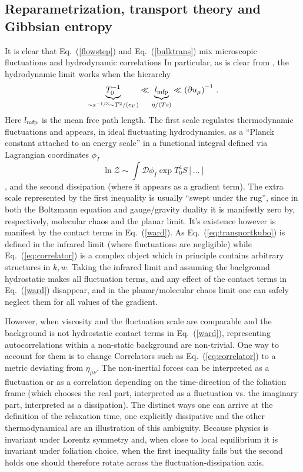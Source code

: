 \documentclass[12pt,onecolumn,showpacs,amssymb,aps,nofootinbib,floatfix]{revtex4-2}
\renewcommand{\eqref}[1]{Eq.~(\ref{#1})}
\newcommand{\lnz}{\ln \mathcal{Z}}
\begin{document}
	\subsection{Reparametrization, transport theory and Gibbsian entropy}\label{reptransport}
	It is clear that \eqref{flowstep} and \eqref{bulktrans} mix microscopic fluctuations and hydrodynamic correlations 
	In particular, as is clear from \cite{montenegro,crooks}, the hydrodynamic limit works when the hierarchy
	\begin{equation}
		\label{hyerarchy}
		\underbrace{T_0^{-1}}_{\sim s^{-1/3} \sim T^2/(c_V)} \ll \underbrace{l_{\rm mfp}}_{\eta/(Ts)} \ll \left( \partial u_{\mu} \right)^{-1}\,.
	\end{equation}
	Here $l_{\rm mfp}$ is the mean free path length.
	The first scale regulates thermodynamic fluctuations \color{black} and appears, in ideal fluctuating hydrodynamics, as a ``Planck constant attached to an energy scale'' in a functional integral defined via Lagrangian coordinates $\phi_I$ \cite{ryblewski}
\[\   \lnz \sim \int \mathcal{D} \phi_I \exp T_0^4 S[...]  \]
, and the second dissipation (where it appears as a gradient term).   \color{black} The extra scale represented by the first inequality is usually ``swept under the rug'', since in both the Boltzmann equation and gauge/gravity duality it is manifestly zero by, respectively, molecular chaos and the planar limit.   It's existence however is manifest by the \color{black}contact terms in \eqref{ward}.  As   \eqref{eq:transportkubo} is defined in the infrared limit (where fluctuations are negligible) while \eqref{eq:correlator} is a complex object which in principle contains arbitrary structures in $k,w$.   Taking the infrared limit and assuming the baclground hydrostatic makes all fluctuation terms, and any effect of the contact terms in \eqref{ward} disappear, and in the planar/molecular chaos limit one can safely neglect them for all values of the gradient.

However, when viscosity and the fluctuation scale are comparable and the background is not hydrostatic contact terms in \eqref{ward}, representing autocorrelations within a non-static background are non-trivial.   One way to account for them is to change
Correlators such as \eqref{eq:correlator} to a metric deviating from $\eta_{\mu \nu}$.  The non-inertial forces \color{black} can be interpreted as a fluctuation or as a correlation depending on the time-direction of the foliation frame (which chooses the real part, interpreted as a fluctuation vs. the imaginary part, interpreted as a dissipation).   The distinct ways one can arrive at the definition of the relaxation time, one explicitly dissipative \cite{jeon,dirkis} and the other thermodynamical \cite{hislim,lindblom} are an illustration of this ambiguity.
        Because physics is invariant under Lorentz symmetry and, when close to local equilibrium it is invariant under foliation choice, when the first inequality fails but the second holds one should therefore rotate across the fluctuation-dissipation axis.
        
\end{document}
